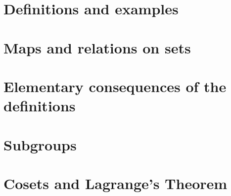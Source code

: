 

\newcommand{\get}[1]{\section{#1}}



\get{Definitions and examples}
\get{Maps and relations on sets}
\get{Elementary consequences of the definitions}
\get{Subgroups}
\get{Cosets and Lagrange's Theorem}


